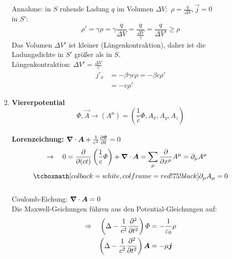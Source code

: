 \begin{enumerate}[1)]
	Annahme: in $ S $ ruhende Ladung $ q $ im Volumen $ \Delta V: $ $ \rho = \frac{q}{\Delta V} , \vec{j} = 0 $\\[5pt]
	in $ S' $:
	\begin{equation*}
	\rho' = \gamma \rho = \gamma \frac{q}{\Delta V} = \frac{q}{\frac{\Delta V}{\gamma}} = \frac{q}{\Delta V'} \ge \rho
	\end{equation*}
	Das Volumen $ \Delta V' $ ist kleiner (Längenkontraktion), daher ist die Ladungsdichte in $ S' $ größer als in $ S $.\\
	Längenkontraktion: $ \Delta V' = \frac{\Delta V}{\gamma} $
	\begin{align*}
	j'_x &= - \beta \gamma c \rho = - \beta c \rho'\\
	&= - v \rho'
	\end{align*}
	\item \textbf{Viererpotential}
	\begin{equation*}
	\Phi, \vec{A} \to (A^{\mu}) = (\frac{1}{c} \Phi, A_x, A_y, A_z)
	\end{equation*}
	\\[5pt]
	\textbf{Lorenzeichung:} $ \bm{\nabla} \cdot \bm{A} + \frac{1}{c^2} \frac{\partial \varPhi}{\partial t} = 0 $
	\begin{align*}
	\rightarrow \quad 0 &= \frac{\partial }{\partial (ct)} \left(\frac{1}{c} \varPhi\right) + \bm{\nabla} \cdot \bm{A} = \sum_{\mu} \frac{\partial }{\partial x^{\mu}} A^{\mu} = \partial _{\mu} A^{\mu}
	\end{align*}
	\begin{equation*}
	\rmbox{\partial_{\mu} A_{\mu} = 0}
	\end{equation*}
	\\[5pt]
	Coulomb-Eichung: $ \bm{\nabla} \cdot \bm{A} = 0 $\\[10pt]
	Die Maxwell-Geichungen führen aus den Potential-Gleichungen auf:
	\begin{align*}
	\Rightarrow \quad \left(\Delta - \frac{1}{c^2} \prt{^2}{t^2}\right) \Phi &= - \frac{1}{\epsilon_0} \rho \\
	\left(\Delta - \frac{1}{c^2} \prt{^2}{t^2}\right) \vec{A} &= - \mu \vec{j}

\end{align*}
\end{enumerate}
